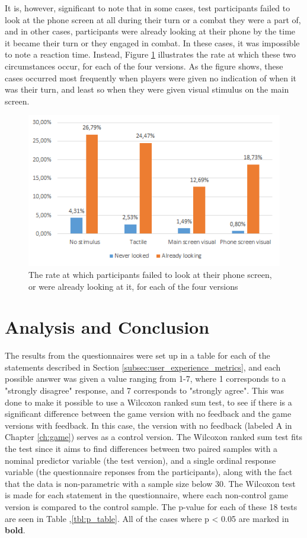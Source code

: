 It is, however, significant to note that in some cases, test participants failed to look at the phone screen at all during their turn or a combat they were a part of, and in other cases, participants were already looking at their phone by the time it became their turn or they engaged in combat. In these cases, it was impossible to note a reaction time. Instead, Figure \ref{fig:looked} illustrates the rate at which these two circumstances occur, for each of the four versions. As the figure shows, these cases occurred most frequently when players were given no indication of when it was their turn, and least so when they were given visual stimulus on the main screen. 

\begin{figure}[h!]
	\centering
	\includegraphics[scale=1]{figures/graph_looked.png}
	\caption{The rate at which participants failed to look at their phone screen, or were already looking at it, for each of the four versions}\label{fig:looked}
\end{figure}

\section{Analysis and Conclusion}
The results from the questionnaires were set up in a table for each of the statements described in Section \ref{subsec:user_experience_metrics}, and each possible answer was given a value ranging from 1-7, where 1 corresponds to a "strongly disagree" response, and 7 corresponds to "strongly agree". This was done to make it possible to use a Wilcoxon ranked sum test, to see if there is a significant difference between the game version with no feedback and the game versions with feedback. In this case, the version with no feedback (labeled A in Chapter \ref{ch:game}) serves as a control version. The Wilcoxon ranked sum test fits the test since it aims to find differences between two paired samples with a nominal predictor variable (the test version), and a single ordinal response variable (the questionnaire reponses from the participants), along with the fact that the data is non-parametric with a sample size below 30. The Wilcoxon test is made for each statement in the questionnaire, where each non-control game version is compared to the control sample. The p-value for each of these 18 tests are seen in Table ,\ref{tbl:p_table}. All of the cases where p < 0.05 are marked in \textbf{bold}.
 


